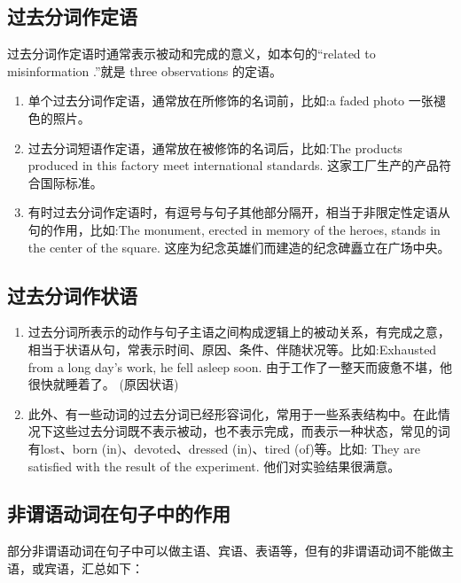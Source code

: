 \subsection{过去分词作定语}

过去分词作定语时通常表示被动和完成的意义，如本句的“related to misinformation .”就是 three observations 的定语。
\begin{enumerate}
  \item 单个过去分词作定语，通常放在所修饰的名词前，比如:a faded photo 一张褪色的照片。
  \item 过去分词短语作定语，通常放在被修饰的名词后，比如:The products produced in this factory meet international standards. 这家工厂生产的产品符合国际标准。
  \item 有时过去分词作定语时，有逗号与句子其他部分隔开，相当于非限定性定语从句的作用，比如:The monument, erected in memory of the heroes, stands in the center of the square. 这座为纪念英雄们而建造的纪念碑矗立在广场中央。
\end{enumerate}

\subsection{过去分词作状语}

\begin{enumerate}
  \item 过去分词所表示的动作与句子主语之间构成逻辑上的被动关系，有完成之意，相当于状语从句，常表示时间、原因、条件、伴随状况等。比如:Exhausted from a long day’s work, he fell asleep soon. 由于工作了一整天而疲惫不堪，他很快就睡着了。 (原因状语)
  \item 此外、有一些动词的过去分词已经形容词化，常用于一些系表结构中。在此情况下这些过去分词既不表示被动，也不表示完成，而表示一种状态，常见的词有lost、born (in)、devoted、dressed (in)、tired (of)等。比如: They are satisfied with the result of the experiment. 他们对实验结果很满意。
\end{enumerate}

\subsection{非谓语动词在句子中的作用}

部分非谓语动词在句子中可以做主语、宾语、表语等，但有的非谓语动词不能做主语，或宾语，汇总如下：

